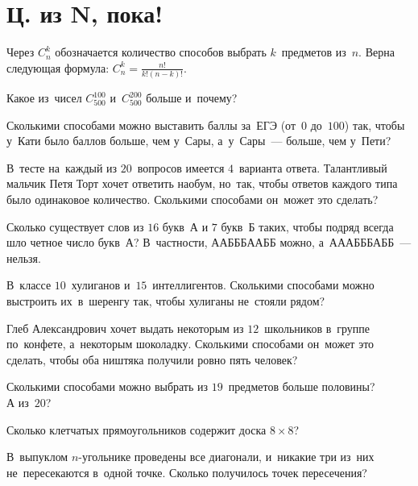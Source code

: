 
\section*{Ц. из N, пока!}


Через $C_{n}^{k}$ обозначается количество способов выбрать $k$~предметов
из~$n$.
Верна следующая формула:
\(
    C_{n}^{k} = \frac{n!}{k! (n - k)!}
\).

\begin{problems}

\item
Какое из~чисел $C_{500}^{100}$ и~$C_{500}^{200}$ больше и~почему?

\item
Сколькими способами можно выставить баллы за~ЕГЭ (от~$0$ до~$100$) так, чтобы
у~Кати было баллов больше, чем у~Сары, а~у~Сары~--- больше, чем у~Пети?

\item
В~тесте на~каждый из $20$~вопросов имеется $4$~варианта ответа.
Талантливый мальчик Петя Торт хочет ответить наобум, но~так, чтобы ответов
каждого типа было одинаковое количество.
Сколькими способами он~может это сделать?

\item
Сколько существует слов из $16$ букв~\textsf{А} и $7$ букв~\textsf{Б} таких,
чтобы подряд всегда шло четное число букв~\textsf{А}?
В~частности, \textsf{ААБББААББ} можно, а~\textsf{АААБББАББ}~--- нельзя.

\item
В~классе $10$~хулиганов и~$15$~интеллигентов.
Сколькими способами можно выстроить их~в~шеренгу так, чтобы хулиганы не~стояли
рядом?

\item
Глеб Александрович хочет выдать некоторым из $12$~школьников в~группе
по~конфете, а~некоторым шоколадку.
Сколькими способами он~может это сделать, чтобы оба ништяка получили ровно пять
человек?

\item
\subproblem
Сколькими способами можно выбрать из $19$~предметов больше половины?
\\
\subproblem А из~$20$?

\item
Сколько клетчатых прямоугольников содержит доска $8 \times 8$?

\item
В~выпуклом $n$-угольнике проведены все диагонали, и~никакие три из~них
не~пересекаются в~одной точке.
Сколько получилось точек пересечения?

\end{problems}

